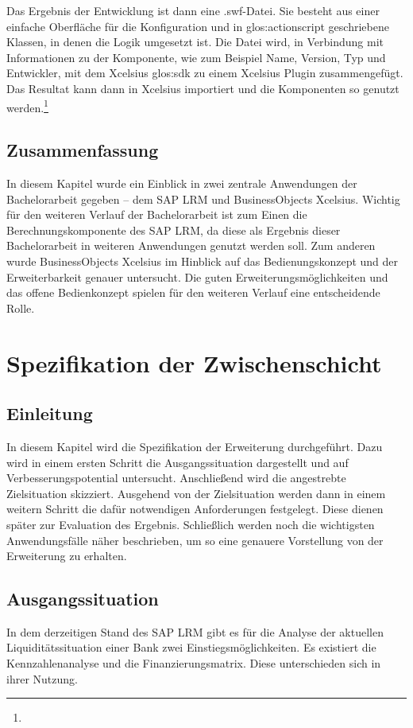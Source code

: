 \begin{onehalfspacing}
Das Ergebnis der Entwicklung ist dann eine .swf-Datei. Sie besteht aus einer einfache Oberfläche für die Konfiguration und in \gls{glos:actionscript} geschriebene Klassen, in denen die Logik umgesetzt ist. Die Datei wird, in Verbindung mit Informationen zu der Komponente, wie zum Beispiel Name, Version, Typ und Entwickler, mit dem \gls{Xcelsius} \gls{glos:sdk} zu einem \gls{Xcelsius} Plugin zusammengefügt. Das Resultat kann dann in \gls{Xcelsius} importiert und die Komponenten so genutzt werden.\footnote{ }

\section{Zusammenfassung}
In diesem Kapitel wurde ein Einblick in zwei zentrale Anwendungen der Bachelorarbeit gegeben -- dem SAP LRM und BusinessObjects Xcelsius. Wichtig für den weiteren Verlauf der Bachelorarbeit ist zum Einen die Berechnungskomponente des SAP LRM, da diese als Ergebnis dieser Bachelorarbeit in weiteren Anwendungen genutzt werden soll. Zum anderen wurde BusinessObjects Xcelsius im Hinblick auf das Bedienungskonzept und der Erweiterbarkeit genauer untersucht. Die guten Erweiterungsmöglichkeiten und das offene Bedienkonzept spielen für den weiteren Verlauf eine entscheidende Rolle.

\chapter{Spezifikation der Zwischenschicht}
\label{sec:spezifikation}

\section{Einleitung}
In diesem Kapitel wird die Spezifikation der Erweiterung durchgeführt. Dazu wird in einem ersten Schritt die Ausgangssituation dargestellt und auf Verbesserungspotential untersucht. Anschließend wird die angestrebte Zielsituation skizziert. Ausgehend von der Zielsituation werden dann in einem weitern Schritt die dafür notwendigen Anforderungen festgelegt. Diese dienen später zur Evaluation des Ergebnis. Schließlich werden noch die wichtigsten Anwendungsfälle näher beschrieben, um so eine genauere Vorstellung von der Erweiterung zu erhalten.

\section{Ausgangssituation}
In dem derzeitigen Stand des SAP LRM gibt es für die Analyse der aktuellen Liquiditätssituation einer Bank zwei Einstiegsmöglichkeiten. Es existiert die Kennzahlenanalyse und die Finanzierungsmatrix. Diese unterschieden sich in ihrer Nutzung.


\end{onehalfspacing}
